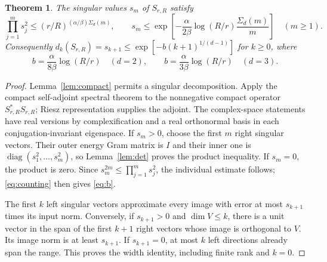 \documentclass[11pt]{article}
\newtheorem{theorem}{Theorem}[section]
\theoremstyle{remark}
\begin{document}
\begin{theorem}\label{thm:ball}
The singular values $s_m$ of $S_{r,R}$ satisfy
\begin{equation}\label{eq:product}
 \prod_{j=1}^m s_j^2\le (r/R)^{(\alpha/\beta)\Sigma_d(m)},\qquad
 s_m\le\exp\left[-\frac\alpha{2\beta}\log(R/r)
                   \frac{\Sigma_d(m)}m\right]\quad(m\ge1).
\end{equation}
Consequently $d_k(S_{r,R})=s_{k+1}\le\exp[-b(k+1)^{1/(d-1)}]$
for $k\ge0$, where
\begin{equation}\label{eq:b}
 b=\frac\alpha{8\beta}\log(R/r)\quad(d=2),\qquad
 b=\frac\alpha{3\beta}\log(R/r)\quad(d=3).
\end{equation}
\end{theorem}
\begin{proof}
Lemma~\ref{lem:compact} permits a singular decomposition. Apply the
compact self-adjoint spectral theorem \cite[p.1]{Melrose2017} to the
nonnegative compact operator $S_{r,R}^*S_{r,R}$; Riesz representation
\cite[Theorem A.16]{GuermondNotes} supplies the adjoint.
The complex-space statements have real versions by complexification
and a real orthonormal basis in each conjugation-invariant eigenspace.
If $s_m>0$, choose the first $m$ right singular vectors. Their outer
energy Gram matrix is $I$ and their inner one is
$\operatorname{diag}(s_1^2,\ldots,s_m^2)$, so Lemma~\ref{lem:det}
proves the product inequality. If $s_m=0$, the product is zero.
Since $s_m^{2m}\le\prod_{j=1}^m s_j^2$, the individual estimate follows;
\eqref{eq:counting} then gives \eqref{eq:b}.

The first $k$ left singular vectors approximate every image with error
at most $s_{k+1}$ times its input norm. Conversely, if $s_{k+1}>0$
and $\dim V\le k$, there is a unit vector in the span of the first
$k+1$ right vectors whose image is orthogonal to $V$. Its image norm
is at least $s_{k+1}$. If $s_{k+1}=0$, at most $k$ left directions
already span the range. This proves the width identity, including
finite rank and $k=0$.
\end{proof}
\end{document}
